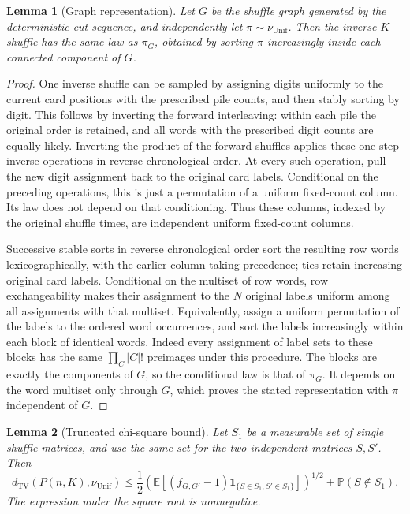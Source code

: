 \documentclass[11pt]{article}
\numberwithin{equation}{section}
\newtheorem{lemma}[lemma]{Lemma}
\newcommand{\TV}{\mathrm{TV}}
\newcommand{\Unif}{\mathrm{Unif}}
\newcommand{\E}{\mathbb E}
\newcommand{\Pp}{\mathbb P}
\newcommand{\1}{\mathbf 1}
\newcommand{\dTV}{d_{\TV}}
\newcommand{\nuUnif}{\nu_{\Unif}}
\begin{document}
\begin{lemma}[Graph representation]
\label{lem:ub-graph-representation}
Let $G$ be the shuffle graph generated by the deterministic cut sequence, and independently let $\pi\sim\nuUnif$. Then the inverse $K$-shuffle has the same law as $\pi_G$, obtained by sorting $\pi$ increasingly inside each connected component of $G$.
\end{lemma}

\begin{proof}
One inverse shuffle can be sampled by assigning digits uniformly to the
current card positions with the prescribed pile counts, and then stably
sorting by digit. This follows by inverting the forward interleaving:
within each pile the original order is retained, and all words with the
prescribed digit counts are equally likely. Inverting the product of the
forward shuffles applies these one-step inverse operations in reverse
chronological order. At every such operation, pull the new digit assignment
back to the original card labels. Conditional on the preceding operations,
this is just a permutation of a uniform fixed-count column. Its law does
not depend on that conditioning. Thus these columns, indexed by the original
shuffle times, are independent uniform fixed-count columns.

Successive stable sorts in reverse chronological order sort the resulting
row words lexicographically, with the earlier column taking precedence;
ties retain increasing original card labels. Conditional on the multiset
of row words, row exchangeability makes their assignment to the \(N\)
original labels uniform among all assignments with that multiset. Equivalently,
assign a uniform permutation of the labels to the ordered word occurrences,
and sort the labels increasingly within each block of identical words.
Indeed every assignment of label sets to these blocks has the same
\(\prod_C|C|!\) preimages under this procedure. The blocks are exactly
the components of \(G\), so the conditional law is that of \(\pi_G\).
It depends on the word multiset only through \(G\), which proves the stated
representation with \(\pi\) independent of \(G\).
\end{proof}

\begin{lemma}[Truncated chi-square bound]
\label{lem:ub-truncated-chi-square}
Let $S_1$ be a measurable set of single shuffle matrices, and use the same
set for the two independent matrices $S,S'$. Then
\begin{equation}
\label{eq:ub-truncated-chi-square}
  \dTV(P(n,K),\nuUnif)
  \le \frac12\left(\E[(f_{G,G'}-1)
             \1_{\{S\in S_1,S'\in S_1\}}]\right)^{1/2}
       +\Pp(S\notin S_1).
\end{equation}
The expression under the square root is nonnegative.
\end{lemma}
\end{document}
